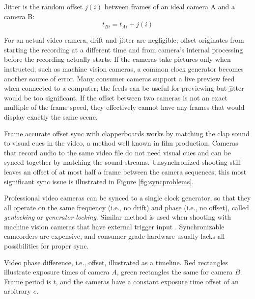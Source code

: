 Jitter is the random offset $j(i)$ between frames of an ideal camera A and a camera B:
\begin{equation} \label{eq:timejitter}
	t_{Bi} = t_{Ai} + j(i)
\end{equation}

For an actual video camera, drift and jitter are negligible; offset originates from starting the recording at a different time and from camera's internal processing before the recording actually starts.
If the cameras take pictures only when instructed, such as machine vision cameras, a common clock generator becomes another source of error.
Many consumer cameras support a live preview feed when connected to a computer; the feeds can be useful for previewing but jitter would be too significant.
If the offset between two cameras is not an exact multiple of the frame speed, they effectively cannot have any frames that would display exactly the same scene.

Frame accurate offset sync with clapperboards works by matching the clap sound to visual cues in the video, a method well known in film production.
Cameras that record audio to the same video file do not need visual cues and can be synced together by matching the sound streams.
Unsynchronized shooting still leaves an offset of at most half a frame between the camera sequences; this most significant sync issue is illustrated in Figure \ref{fig:syncproblems}.

Professional video cameras can be synced to a single clock generator, so that they all operate on the same frequency (i.e., no drift) and phase (i.e., no offset), called \emph{genlocking} or \emph{generator locking}.
Similar method is used when shooting with machine vision cameras that have external trigger input \cite{poynton1996technical}.
Synchronizable camcorders are expensive, and consumer-grade hardware usually lacks all possibilities for proper sync.

{Video phase difference, i.e., offset, illustrated as a timeline.
Red rectangles illustrate exposure times of camera $A$, green rectangles the same for camera $B$.
Frame period is $t$, and the cameras have a constant exposure time offset of an arbitrary $e$.}

